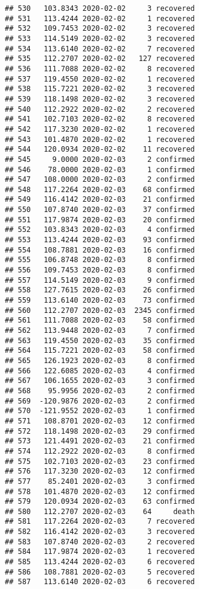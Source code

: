 \documentclass[
]{article}
\begin{document}
\begin{verbatim}
## 530   103.8343 2020-02-02     3 recovered
## 531   113.4244 2020-02-02     1 recovered
## 532   109.7453 2020-02-02     3 recovered
## 533   114.5149 2020-02-02     3 recovered
## 534   113.6140 2020-02-02     7 recovered
## 535   112.2707 2020-02-02   127 recovered
## 536   111.7088 2020-02-02     8 recovered
## 537   119.4550 2020-02-02     1 recovered
## 538   115.7221 2020-02-02     3 recovered
## 539   118.1498 2020-02-02     3 recovered
## 540   112.2922 2020-02-02     2 recovered
## 541   102.7103 2020-02-02     8 recovered
## 542   117.3230 2020-02-02     1 recovered
## 543   101.4870 2020-02-02     1 recovered
## 544   120.0934 2020-02-02    11 recovered
## 545     9.0000 2020-02-03     2 confirmed
## 546    78.0000 2020-02-03     1 confirmed
## 547   108.0000 2020-02-03     2 confirmed
## 548   117.2264 2020-02-03    68 confirmed
## 549   116.4142 2020-02-03    21 confirmed
## 550   107.8740 2020-02-03    37 confirmed
## 551   117.9874 2020-02-03    20 confirmed
## 552   103.8343 2020-02-03     4 confirmed
## 553   113.4244 2020-02-03    93 confirmed
## 554   108.7881 2020-02-03    16 confirmed
## 555   106.8748 2020-02-03     8 confirmed
## 556   109.7453 2020-02-03     8 confirmed
## 557   114.5149 2020-02-03     9 confirmed
## 558   127.7615 2020-02-03    26 confirmed
## 559   113.6140 2020-02-03    73 confirmed
## 560   112.2707 2020-02-03  2345 confirmed
## 561   111.7088 2020-02-03    58 confirmed
## 562   113.9448 2020-02-03     7 confirmed
## 563   119.4550 2020-02-03    35 confirmed
## 564   115.7221 2020-02-03    58 confirmed
## 565   126.1923 2020-02-03     8 confirmed
## 566   122.6085 2020-02-03     4 confirmed
## 567   106.1655 2020-02-03     3 confirmed
## 568    95.9956 2020-02-03     2 confirmed
## 569  -120.9876 2020-02-03     2 confirmed
## 570  -121.9552 2020-02-03     1 confirmed
## 571   108.8701 2020-02-03    12 confirmed
## 572   118.1498 2020-02-03    29 confirmed
## 573   121.4491 2020-02-03    21 confirmed
## 574   112.2922 2020-02-03     8 confirmed
## 575   102.7103 2020-02-03    23 confirmed
## 576   117.3230 2020-02-03    12 confirmed
## 577    85.2401 2020-02-03     3 confirmed
## 578   101.4870 2020-02-03    12 confirmed
## 579   120.0934 2020-02-03    63 confirmed
## 580   112.2707 2020-02-03    64     death
## 581   117.2264 2020-02-03     7 recovered
## 582   116.4142 2020-02-03     3 recovered
## 583   107.8740 2020-02-03     2 recovered
## 584   117.9874 2020-02-03     1 recovered
## 585   113.4244 2020-02-03     6 recovered
## 586   108.7881 2020-02-03     5 recovered
## 587   113.6140 2020-02-03     6 recovered

\end{verbatim}
\end{document}
